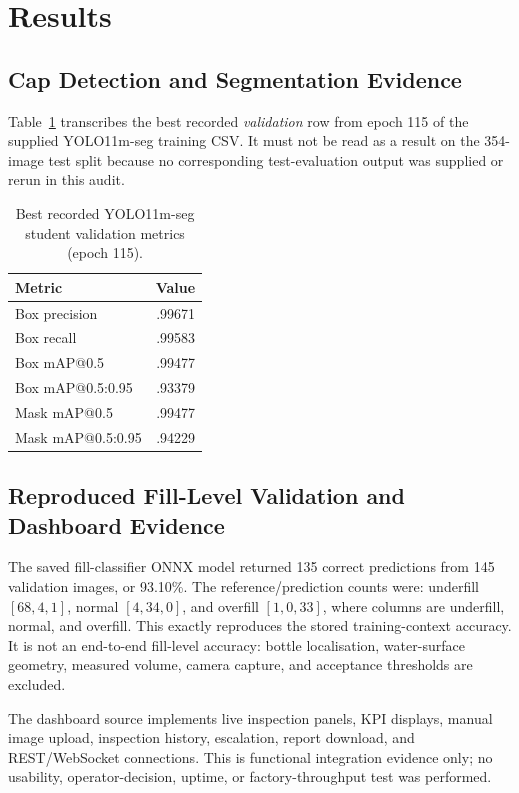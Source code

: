 \documentclass[conference]{../IEEE_paper/IEEEtran}
\begin{document}
\section{Results}
\subsection{Cap Detection and Segmentation Evidence}
Table~\ref{tab:seg} transcribes the best recorded \emph{validation} row from epoch 115 of the supplied YOLO11m-seg training CSV. It must not be read as a result on the 354-image test split because no corresponding test-evaluation output was supplied or rerun in this audit.
\begin{table}[!t]\caption{Best recorded YOLO11m-seg student validation metrics (epoch 115).}\label{tab:seg}\centering\begin{tabular}{lr}\toprule Metric & Value\\\midrule Box precision & .99671\\ Box recall & .99583\\ Box mAP@0.5 & .99477\\ Box mAP@0.5:0.95 & .93379\\ Mask mAP@0.5 & .99477\\ Mask mAP@0.5:0.95 & .94229\\\bottomrule\end{tabular}\end{table}

\subsection{Reproduced Fill-Level Validation and Dashboard Evidence}
The saved fill-classifier ONNX model returned 135 correct predictions from 145 validation images, or 93.10\%. The reference/prediction counts were: underfill $[68,4,1]$, normal $[4,34,0]$, and overfill $[1,0,33]$, where columns are underfill, normal, and overfill. This exactly reproduces the stored training-context accuracy. It is not an end-to-end fill-level accuracy: bottle localisation, water-surface geometry, measured volume, camera capture, and acceptance thresholds are excluded.

The dashboard source implements live inspection panels, KPI displays, manual image upload, inspection history, escalation, report download, and REST/WebSocket connections. This is functional integration evidence only; no usability, operator-decision, uptime, or factory-throughput test was performed.
\end{document}
